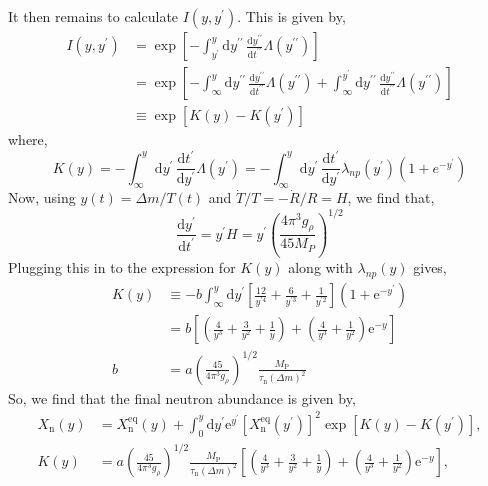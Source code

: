 \documentclass[11pt]{article}
\numberwithin{equation}{section}
\numberwithin{figure}{section}
\numberwithin{table}{section}
\begin{document}
It then remains to calculate $I(y, y^{\prime})$. This is given by,
\begin{align*}
I(y, y^{\prime}) &= \exp \left[-\int_{y^{\prime}}^{y}{\mathrm{d}y^{\prime \prime}\, \frac{\mathrm{d}y^{\prime\prime}}{\mathrm{d}t^{\prime\prime}} \Lambda(y^{\prime\prime})}\right] \\
&= \exp\left[-\int_{\infty}^{y}{\mathrm{d}y^{\prime \prime}\, \frac{\mathrm{d}y^{\prime\prime}}{\mathrm{d}t^{\prime\prime}} \Lambda(y^{\prime\prime})} + \int_{\infty}^{y^{\prime}}{\mathrm{d}y^{\prime \prime}\, \frac{\mathrm{d}y^{\prime\prime}}{\mathrm{d}t^{\prime\prime}} \Lambda(y^{\prime\prime})}\right] \\
&\equiv \exp\left[K(y) - K(y^{\prime})\right]
\end{align*}
where,
\begin{equation}
K(y) = -\int_{\infty}^{y}{\mathrm{d}y^{\prime} \, \frac{\mathrm{d}t^{\prime}}{\mathrm{d}y^{\prime}}\Lambda(y^{\prime})} = -\int_{\infty}^{y}{\mathrm{d}y^{\prime} \, \frac{\mathrm{d}t^{\prime}}{\mathrm{d}y^{\prime}}\lambda_{np}(y^{\prime})(1 + e^{-y^{\prime}})}
\end{equation}
Now, using $y(t) = \Delta m/T(t)$ and $\dot{T}/T = -\dot{R}/R = H$, we find that,
\begin{equation}
\frac{\mathrm{d}y^{\prime}}{\mathrm{d}t^{\prime}} = y^{\prime}H = y^{\prime} \left(\frac{4\pi^3 g_\rho}{45 M_P}\right)^{1/2}
\end{equation}
Plugging this in to the expression for $K(y)$ along with $\lambda_{np}(y)$ gives,
\begin{align*}
K(y) &\equiv -b \int_{\infty}^{y} \mathrm{d} y^{\prime}\left[\frac{12}{y^{\prime 4}}+\frac{6}{y^{\prime 3}}+\frac{1}{y^{\prime 2}}\right]\left(1+\mathrm{e}^{-y^{\prime}}\right) \\
&=b\left[\left(\frac{4}{y^{3}}+\frac{3}{y^{2}}+\frac{1}{y}\right)+\left(\frac{4}{y^{3}}+\frac{1}{y^{2}}\right) \mathrm{e}^{-y}\right] \\
b&=a\left(\frac{45}{4 \pi^{3} g_{\rho}}\right)^{1 / 2} \frac{M_{\mathrm{P}}}{\tau_{\mathrm{n}}(\Delta m)^{2}}
\end{align*}
So, we find that the final neutron abundance is given by,
\begin{align}
X_{\mathrm{n}}(y)&=X_{\mathrm{n}}^{\mathrm{eq}}(y)+\int_{0}^{y} \mathrm{d} y^{\prime} \mathrm{e}^{y^{\prime}}\left[X_{\mathrm{n}}^{\mathrm{eq}}\left(y^{\prime}\right)\right]^{2} \exp \left[K(y)-K\left(y^{\prime}\right)\right], \\
K(y) &= a\left(\frac{45}{4 \pi^{3} g_{\rho}}\right)^{1 / 2} \frac{M_{\mathrm{P}}}{\tau_{\mathrm{n}}(\Delta m)^{2}}\left[\left(\frac{4}{y^{3}}+\frac{3}{y^{2}}+\frac{1}{y}\right)+\left(\frac{4}{y^{3}}+\frac{1}{y^{2}}\right) \mathrm{e}^{-y}\right],
\end{align}
\end{document}
